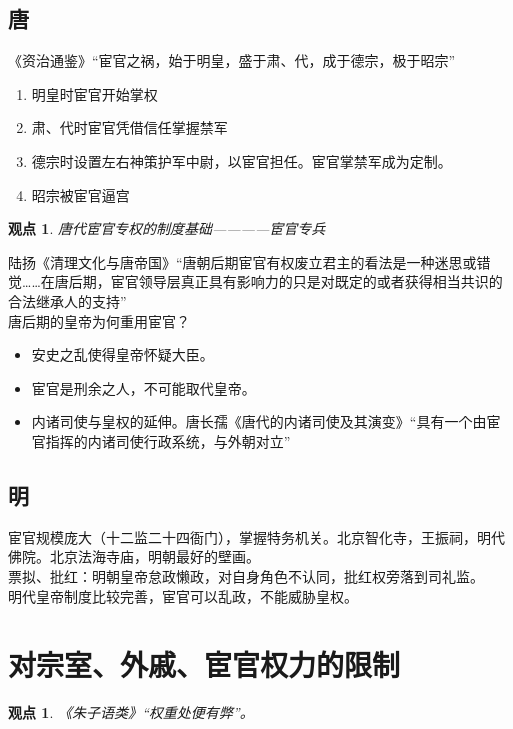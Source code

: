 \documentclass[twoside]{article}
\newtheorem{claim}[theorem]{观点}
\begin{document}
\subsection{唐}
《资治通鉴》``宦官之祸，始于明皇，盛于肃、代，成于德宗，极于昭宗''
\begin{enumerate}
  \item 明皇时宦官开始掌权
  \item 肃、代时宦官凭借信任掌握禁军
  \item 德宗时设置左右神策护军中尉，以宦官担任。宦官掌禁军成为定制。
  \item 昭宗被宦官逼宫
\end{enumerate}
\begin{claim}
  唐代宦官专权的制度基础————宦官专兵
\end{claim}
陆扬《清理文化与唐帝国》``唐朝后期宦官有权废立君主的看法是一种迷思或错觉……在唐后期，宦官领导层真正具有影响力的只是对既定的或者获得相当共识的合法继承人的支持''\\
唐后期的皇帝为何重用宦官？
\begin{itemize}
  \item 安史之乱使得皇帝怀疑大臣。
  \item 宦官是刑余之人，不可能取代皇帝。
  \item 内诸司使与皇权的延伸。唐长孺《唐代的内诸司使及其演变》``具有一个由宦官指挥的内诸司使行政系统，与外朝对立''
\end{itemize}

\subsection{明}
宦官规模庞大（十二监二十四衙门），掌握特务机关。北京智化寺，王振祠，明代佛院。北京法海寺庙，明朝最好的壁画。\\
票拟、批红：明朝皇帝怠政懒政，对自身角色不认同，批红权旁落到司礼监。\\
明代皇帝制度比较完善，宦官可以乱政，不能威胁皇权。

\section{对宗室、外戚、宦官权力的限制}
\begin{claim}
  《朱子语类》``权重处便有弊''。
\end{claim}
\end{document}
